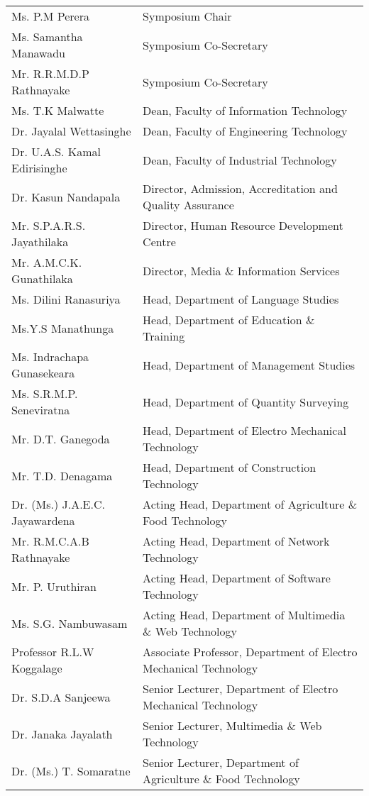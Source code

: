 \begin{longtable}{ L{4.8cm}  L{6.5cm} }  

      Ms. P.M Perera & Symposium Chair \\
    Ms. Samantha Manawadu & Symposium Co-Secretary \\
    Mr. R.R.M.D.P Rathnayake & Symposium Co-Secretary \\
    Ms. T.K Malwatte & Dean, Faculty of Information Technology \\
    Dr. Jayalal Wettasinghe & Dean, Faculty of Engineering Technology \\
    Dr. U.A.S. Kamal Edirisinghe & Dean, Faculty of Industrial Technology \\
    Dr. Kasun Nandapala & Director, Admission, Accreditation and Quality Assurance \\
    Mr. S.P.A.R.S. Jayathilaka & Director, Human Resource Development Centre \\
    Mr. A.M.C.K. Gunathilaka & Director, Media \& Information Services \\
    Ms. Dilini Ranasuriya & Head, Department of Language Studies \\
    Ms.Y.S Manathunga & Head, Department of Education \& Training \\
    Ms. Indrachapa Gunasekeara & Head, Department of Management Studies \\
    Ms. S.R.M.P. Seneviratna & Head, Department of Quantity Surveying \\
    Mr. D.T. Ganegoda & Head, Department of Electro Mechanical Technology \\
    Mr. T.D. Denagama & Head, Department of Construction Technology \\
    Dr. (Ms.) J.A.E.C. Jayawardena & Acting Head, Department of Agriculture \& Food Technology \\
    Mr. R.M.C.A.B Rathnayake & Acting Head, Department of Network Technology \\
    Mr. P. Uruthiran & Acting Head, Department of Software Technology \\
    Ms. S.G. Nambuwasam & Acting Head, Department of Multimedia \& Web Technology \\
    Professor R.L.W Koggalage & Associate Professor, Department of Electro Mechanical Technology \\
    Dr. S.D.A Sanjeewa & Senior Lecturer, Department of Electro Mechanical Technology \\
    Dr. Janaka Jayalath & Senior Lecturer, Multimedia \& Web Technology \\
    Dr. (Ms.) T. Somaratne & Senior Lecturer, Department of Agriculture \& Food Technology \\
    

\end{longtable}
